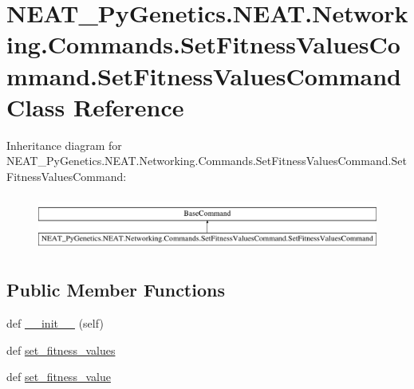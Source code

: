 \hypertarget{classNEAT__PyGenetics_1_1NEAT_1_1Networking_1_1Commands_1_1SetFitnessValuesCommand_1_1SetFitnessValuesCommand}{}\section{N\+E\+A\+T\+\_\+\+Py\+Genetics.\+N\+E\+A\+T.\+Networking.\+Commands.\+Set\+Fitness\+Values\+Command.\+Set\+Fitness\+Values\+Command Class Reference}
\label{classNEAT__PyGenetics_1_1NEAT_1_1Networking_1_1Commands_1_1SetFitnessValuesCommand_1_1SetFitnessValuesCommand}
Inheritance diagram for N\+E\+A\+T\+\_\+\+Py\+Genetics.\+N\+E\+A\+T.\+Networking.\+Commands.\+Set\+Fitness\+Values\+Command.\+Set\+Fitness\+Values\+Command\+:\begin{figure}[H]
\begin{center}
\leavevmode
\includegraphics[height=1.851240cm]{classNEAT__PyGenetics_1_1NEAT_1_1Networking_1_1Commands_1_1SetFitnessValuesCommand_1_1SetFitnessValuesCommand}
\end{center}
\end{figure}
\subsection*{Public Member Functions}
\begin{DoxyCompactItemize}
\item 
def \hyperlink{classNEAT__PyGenetics_1_1NEAT_1_1Networking_1_1Commands_1_1SetFitnessValuesCommand_1_1SetFitnessValuesCommand_af1878c6d7a7fcb3d42693ebf5ab9a8f9}{\+\_\+\+\_\+init\+\_\+\+\_\+} (self)
\item 
def \hyperlink{classNEAT__PyGenetics_1_1NEAT_1_1Networking_1_1Commands_1_1SetFitnessValuesCommand_1_1SetFitnessValuesCommand_ad422d62ec35756ac1375c71222e902ba}{set\+\_\+fitness\+\_\+values}
\item 
def \hyperlink{classNEAT__PyGenetics_1_1NEAT_1_1Networking_1_1Commands_1_1SetFitnessValuesCommand_1_1SetFitnessValuesCommand_a44c78bd4ea207b596aa62cf5e6ee5ebc}{set\+\_\+fitness\+\_\+value}
\end{DoxyCompactItemize}


